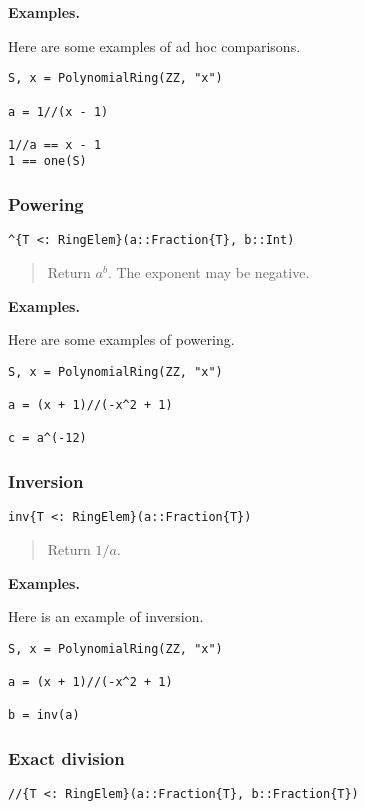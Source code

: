 \documentclass[a4paper,10pt]{article}
\newcommand{\desc}[1]{\vspace{-3mm}\begin{quote}#1\end{quote}}
\begin{document}
\textbf{Examples.}

Here are some examples of ad hoc comparisons.

\begin{lstlisting}
S, x = PolynomialRing(ZZ, "x")

a = 1//(x - 1)

1//a == x - 1
1 == one(S)
\end{lstlisting}

\subsubsection{Powering}

\begin{lstlisting}
^{T <: RingElem}(a::Fraction{T}, b::Int)
\end{lstlisting}

\desc{Return $a^b$. The exponent may be negative.}

\textbf{Examples.}

Here are some examples of powering.

\begin{lstlisting}
S, x = PolynomialRing(ZZ, "x")

a = (x + 1)//(-x^2 + 1)

c = a^(-12)
\end{lstlisting}

\subsubsection{Inversion}

\begin{lstlisting}
inv{T <: RingElem}(a::Fraction{T})
\end{lstlisting}

\desc{Return $1/a$.}

\textbf{Examples.}

Here is an example of inversion.

\begin{lstlisting}
S, x = PolynomialRing(ZZ, "x")

a = (x + 1)//(-x^2 + 1)

b = inv(a)
\end{lstlisting}

\subsubsection{Exact division}

\begin{lstlisting}
//{T <: RingElem}(a::Fraction{T}, b::Fraction{T})
\end{lstlisting}
\end{document}
